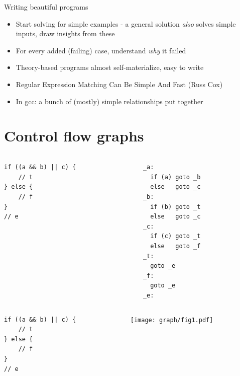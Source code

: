 \documentclass[xcolor = {dvipsnames, table}]{beamer}
\begin{document}
\begin{frame}
    \begin{block}{Writing beautiful programs}
        \begin{itemize}
            \item Start solving for simple examples - a general solution
                \emph{also} solves simple inputs, draw insights from these
            \item For every added (failing) case, understand \emph{why} it failed
            \item Theory-based programs almost self-materialize, easy to write
            \item Regular Expression Matching Can Be Simple And Fast (Russ Cox)
            \item In gcc: a bunch of (mostly) simple relationships put together
        \end{itemize}
    \end{block}
\end{frame}

\section{Control flow graphs}

\begin{frame}[fragile]
    \begin{columns}
        \begin{column}{0.4\textwidth}
            \begin{lstlisting}[basicstyle = \footnotesize\ttfamily]
if ((a && b) || c) {
    // t
} else {
    // f
}
// e
            \end{lstlisting}
        \end{column}
        \begin{column}{0.4\textwidth}
            \begin{lstlisting}[basicstyle = \footnotesize\ttfamily]
_a:
  if (a) goto _b
  else   goto _c
_b:
  if (b) goto _t
  else   goto _c
_c:
  if (c) goto _t
  else   goto _f
_t:
  goto _e
_f:
  goto _e
_e:
            \end{lstlisting}
        \end{column}
    \end{columns}
\end{frame}

\begin{frame}[fragile]
    \begin{columns}
        \begin{column}{0.4\textwidth}
            \begin{lstlisting}[basicstyle = \footnotesize\ttfamily]
if ((a && b) || c) {
    // t
} else {
    // f
}
// e
            \end{lstlisting}
        \end{column}
        \begin{column}{0.4\textwidth}
            \texttt{[image: graph/fig1.pdf]}
        \end{column}
    \end{columns}
\end{frame}
\end{document}
